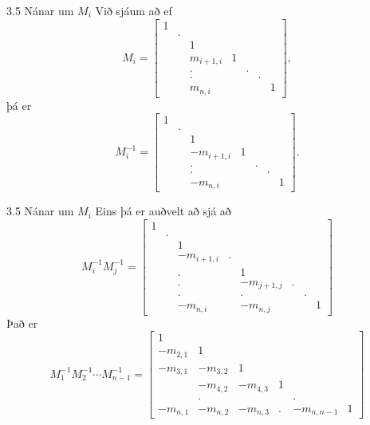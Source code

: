 \begin{frame}{3.5 Nánar um $M_i$}
 Við sjáum að ef 
$$
M_i = \left[
\begin{array}{ccccccc}
1 &   &   &   &   &   &  \\
  & . &   &   &   &   &  \\
  &   & 1 &   &   &   &  \\
  &   & m_{i+1,i} & 1 &   &   &  \\
  &   & . &   & . &   &  \\
  &   & . &   &   & . &  \\
  &   & m_{n,i} &   &   &   & 1
\end{array}\right],
$$
þá er 
$$
M_i^{-1} = \left[
\begin{array}{ccccccc}
1 &   &   &   &   &   &  \\
  & . &   &   &   &   &  \\
  &   & 1 &   &   &   &  \\
  &   & -m_{i+1,i} & 1 &   &   &  \\
  &   & . &   & . &   &  \\
  &   & . &   &   & . &  \\
  &   & -m_{n,i} &   &   &   & 1
\end{array}\right].
$$

\end{frame}


\begin{frame}{3.5 Nánar um $M_i$}
Eins þá er auðvelt að sjá að 
$$
M_i^{-1} M_j^{-1} = \left[
\begin{array}{cccccccc}
1 &   &   &   &   &   &   &  \\
  & . &   &   &   &   &   &  \\
  &   & 1 &   &   &   &   &  \\
  &   & -m_{i+1,i} & . &   &   &   &  \\
  &   & . &   & 1 &   &   &  \\
  &   & . &   & -m_{j+1,j} & . &   &  \\
  &   & . &   & . &   & . &  \\
  &   & -m_{n,i} &   & -m_{n,j} &   &   & 1
\end{array}
\right]
$$\pause
Það er
$$
M_1^{-1} M_2^{-1} \cdots M_{n-1}^{-1} = \left[
\begin{array}{cccccc}
1 &   &   &   &   &     \\
-m_{2,1} & 1 &   &   &     &  \\
-m_{3,1} & -m_{3,2} & 1 &    &   &  \\
  & -m_{4,2} & -m_{4,3} & 1   &   &  \\
  & . &   &   & . &    \\
-m_{n,1} & -m_{n,2} & -m_{n,3} & . & -m_{n,n-1}  & 1
   \end{array}
\right]
$$

\end{frame}


